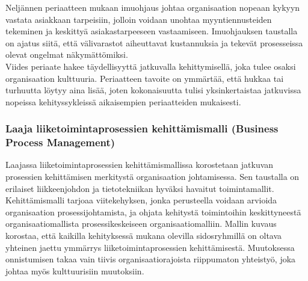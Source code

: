 \documentclass[finnish,12pt,a4paper,pdftex]{article}
\begin{document}
Neljännen periaatteen mukaan imuohjaus johtaa organisaation nopeaan kykyyn vastata asiakkaan tarpeisiin, jolloin voidaan unohtaa myyntiennusteiden tekeminen ja keskittyä asiakastarpeeseen vastaamiseen. Imuohjauksen taustalla on ajatus siitä, että välivarastot aiheuttavat kustannuksia ja tekevät prosesseissa olevat ongelmat näkymättömiksi.\\

Viides periaate hakee täydellisyyttä jatkuvalla kehittymisellä, joka tulee osaksi organisaation kulttuuria. Periaatteen tavoite on ymmärtää, että hukkaa tai turhuutta löytyy aina lisää, joten kokonaisuutta tulisi yksinkertaistaa jatkuvissa nopeissa kehityssykleissä aikaisempien periaatteiden mukaisesti.\\



\subsubsection{Laaja liiketoimintaprosessien kehittämismalli (Business Process Management)}



Laajassa liiketoimintaprosessien kehittämismallissa korostetaan jatkuvan prosessien kehittämisen merkitystä organisaation johtamisessa. Sen taustalla on erilaiset liikkeenjohdon ja tietotekniikan hyväksi havaitut toimintamallit. Kehittämismalli tarjoaa viitekehyksen, jonka perusteella voidaan arvioida organisaation prosessijohtamista, ja ohjata kehitystä toimintoihin keskittyneestä organisaatiomallista prosessikeskeiseen organisaatiomalliin. Mallin kuvaus korostaa, että kaikilla kehityksessä mukana olevilla sidosryhmillä on oltava yhteinen jaettu ymmärrys liiketoimintaprosessien kehittämisestä. Muutoksessa onnistumisen takaa vain tiivis organisaatiorajoista riippumaton yhteistyö, joka johtaa myös kulttuurisiin muutoksiin. \citep{weske}\\
\end{document}
